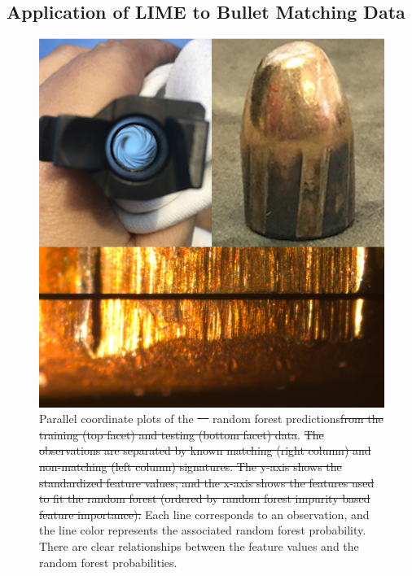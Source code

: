 \documentclass[AMS,STIX2COL]{WileyNJD-v2}\usepackage[]{graphicx}\usepackage[]{color}
\newenvironment{knitrout}{}{} %
\providecommand{\DIFadd}[1]{{\protect\color{blue}\uwave{#1}}} %
\providecommand{\DIFdel}[1]{{\protect\color{red}\sout{#1}}}                      %
\providecommand{\DIFaddFL}[1]{\DIFadd{#1}} %
\providecommand{\DIFdelFL}[1]{\DIFdel{#1}} %
\providecommand{\DIFaddbeginFL}{} %
\providecommand{\DIFaddendFL}{} %
\providecommand{\DIFdelbeginFL}{} %
\providecommand{\DIFdelendFL}{} %
\newcommand{\DIFscaledelfig}{0.5}
\newlength{\DIFdelgraphicswidth} %
\newlength{\DIFdelgraphicsheight} %
\newcommand{\DIFaddincludegraphics}[2][]{{\color{blue}\fbox{\DIFOincludegraphics[#1]{#2}}}} %
\newcommand{\DIFdelincludegraphics}[2][]{%
\sbox{\DIFdelgraphicsbox}{\DIFOincludegraphics[#1]{#2}}%
\settoboxwidth{\DIFdelgraphicswidth}{\DIFdelgraphicsbox} %
\settoboxtotalheight{\DIFdelgraphicsheight}{\DIFdelgraphicsbox} %
\scalebox{\DIFscaledelfig}{%
\parbox[b]{\DIFdelgraphicswidth}{\usebox{\DIFdelgraphicsbox}\\[-\baselineskip] \rule{\DIFdelgraphicswidth}{0em}}\llap{\resizebox{\DIFdelgraphicswidth}{\DIFdelgraphicsheight}{%
\setlength{\unitlength}{\DIFdelgraphicswidth}%
\begin{picture}(1,1)%
\thicklines\linethickness{2pt} %
{\color[rgb]{1,0,0}\put(0,0){\framebox(1,1){}}}%
{\color[rgb]{1,0,0}\put(0,0){\line( 1,1){1}}}%
{\color[rgb]{1,0,0}\put(0,1){\line(1,-1){1}}}%
\end{picture}%
}\hspace*{3pt}}} %
} %
\DeclareRobustCommand{\DIFaddbeginFL}{\DIFOaddbeginFL \let\includegraphics\DIFaddincludegraphics} %
\DeclareRobustCommand{\DIFaddendFL}{\DIFOaddendFL \let\includegraphics\DIFOincludegraphics} %
\DeclareRobustCommand{\DIFdelbeginFL}{\DIFOdelbeginFL \let\includegraphics\DIFdelincludegraphics} %
\DeclareRobustCommand{\DIFdelendFL}{\DIFOaddendFL \let\includegraphics\DIFOincludegraphics} %
\begin{document}
\subsection{Application of LIME to Bullet Matching Data}

\begin{figure}[!thp]
\begin{knitrout}
\color{fgcolor}

{\centering \DIFdelbeginFL %
\DIFdelendFL \DIFaddbeginFL \includegraphics[width=6.5in]{figure-static/figure-08-1}
\DIFaddendFL

}



\end{knitrout}
\caption{Parallel coordinate plots of the \DIFdelbeginFL \DIFdelFL{\mbox{%
\citet{hare:2017} }\hspace{0pt}%
}\DIFdelendFL \DIFaddbeginFL \DIFaddFL{bullet matching }\DIFaddendFL random forest predictions\DIFdelbeginFL \DIFdelFL{from the training (top facet) and testing (bottom facet) data}\DIFdelendFL . \DIFdelbeginFL \DIFdelFL{The observations are separated by known matching (right column) and non-matching (left column) signatures. The y-axis shows the standardized feature values, and the x-axis shows the features used to fit the random forest (ordered by random forest impurity based feature importance). }\DIFdelendFL Each line corresponds to an observation, and the line color represents the associated random forest probability. There are clear relationships between the feature values and the random forest probabilities.}
\DIFdelbeginFL %
\DIFdelendFL \DIFaddbeginFL \label{fig:figure-08}
\DIFaddendFL \end{figure}
\end{document}
